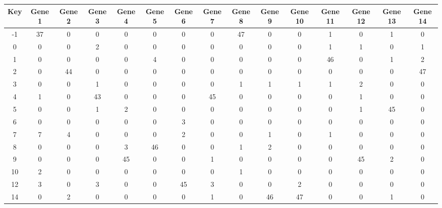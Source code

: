 \begin{tabular}{|c|c|c|c|c|c|c|c|c|c|c|c|c|c|c|}
\hline
Key & Gene 1 & Gene 2 & Gene 3 & Gene 4 & Gene 5 & Gene 6 & Gene 7 & Gene 8 & Gene 9 & Gene 10 & Gene 11 & Gene 12 & Gene 13 & Gene 14 \\
\hline
-1 & 37 & 0 & 0 & 0 & 0 & 0 & 0 & 47 & 0 & 0 & 1 & 0 & 1 & 0 \\
0 & 0 & 0 & 2 & 0 & 0 & 0 & 0 & 0 & 0 & 0 & 1 & 1 & 0 & 1 \\
1 & 0 & 0 & 0 & 0 & 4 & 0 & 0 & 0 & 0 & 0 & 46 & 0 & 1 & 2 \\
2 & 0 & 44 & 0 & 0 & 0 & 0 & 0 & 0 & 0 & 0 & 0 & 0 & 0 & 47 \\
3 & 0 & 0 & 1 & 0 & 0 & 0 & 0 & 1 & 1 & 1 & 1 & 2 & 0 & 0 \\
4 & 1 & 0 & 43 & 0 & 0 & 0 & 45 & 0 & 0 & 0 & 0 & 1 & 0 & 0 \\
5 & 0 & 0 & 1 & 2 & 0 & 0 & 0 & 0 & 0 & 0 & 0 & 1 & 45 & 0 \\
6 & 0 & 0 & 0 & 0 & 0 & 3 & 0 & 0 & 0 & 0 & 0 & 0 & 0 & 0 \\
7 & 7 & 4 & 0 & 0 & 0 & 2 & 0 & 0 & 1 & 0 & 1 & 0 & 0 & 0 \\
8 & 0 & 0 & 0 & 3 & 46 & 0 & 0 & 1 & 2 & 0 & 0 & 0 & 0 & 0 \\
9 & 0 & 0 & 0 & 45 & 0 & 0 & 1 & 0 & 0 & 0 & 0 & 45 & 2 & 0 \\
10 & 2 & 0 & 0 & 0 & 0 & 0 & 0 & 1 & 0 & 0 & 0 & 0 & 0 & 0 \\
12 & 3 & 0 & 3 & 0 & 0 & 45 & 3 & 0 & 0 & 2 & 0 & 0 & 0 & 0 \\
14 & 0 & 2 & 0 & 0 & 0 & 0 & 1 & 0 & 46 & 47 & 0 & 0 & 1 & 0 \\
\hline
\end{tabular}